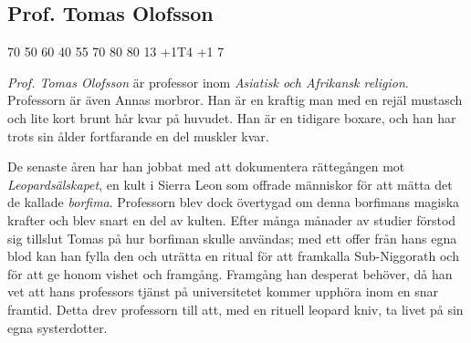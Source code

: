 \subsection{Prof. Tomas Olofsson}
\label{kar:TomasOlofsson}
\character
{70}	%
{50}	%
{60}	%
{40}	%
{55}	%
{70}	%
{80}	%
{80}	%
{13}	%
{+1T4}	%
{+1}	%
{7}		%
%
{
}
%
{
\textit{Prof. Tomas Olofsson} är professor inom \textit{Asiatisk och Afrikansk religion}. Professorn är även Annas morbror. Han är en kraftig man med en rejäl mustasch och lite kort brunt hår kvar på huvudet. Han är en tidigare boxare, och han har trots sin ålder fortfarande en del muskler kvar.

De senaste åren har han jobbat med att dokumentera rättegången mot \textit{Leopardsälskapet}, en kult i Sierra Leon som offrade människor för att mätta det de kallade \textit{borfima}. Professorn blev dock övertygad om denna borfimans magiska krafter och blev snart en del av kulten. Efter många månader av studier förstod sig tillslut Tomas på hur borfiman skulle användas; med ett offer från hans egna blod kan han fylla den och uträtta en ritual för att framkalla Sub-Niggorath och för att ge honom vishet och framgång. Framgång han desperat behöver, då han vet att hans professors tjänst på universitetet kommer upphöra inom en snar framtid. Detta drev professorn till att, med en rituell leopard kniv, ta livet på sin egna systerdotter.
}
%

